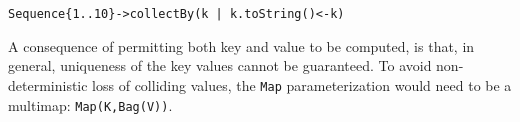 \documentclass{llncs}
\begin{document}
\verb$Sequence{1..10}->collectBy(k | k.toString()<-k)$ 

A consequence of permitting both key and value to be computed, is that, in general, uniqueness of the key values cannot be guaranteed. To avoid non-deterministic loss of colliding values, the \verb$Map$ parameterization would need to be a multimap: \verb$Map(K,Bag(V))$. 
\end{document}
